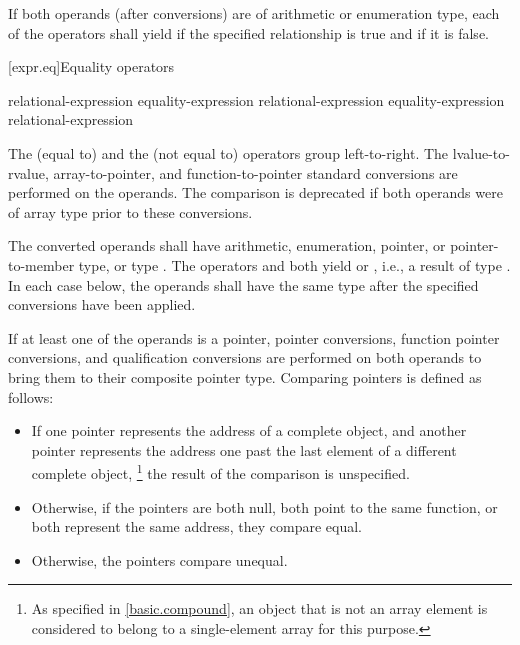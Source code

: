 \pnum
If both operands (after conversions) are of arithmetic or enumeration type, each
of the operators shall yield  if the specified relationship is true
and  if it is false.

[expr.eq]{Equality operators}%
%
%

\begin{bnf}
\br
    relational-expression\br
    equality-expression \terminal{==} relational-expression\br
    equality-expression \terminal{!=} relational-expression
\end{bnf}

\pnum
The \tcode{==} (equal to) and the \tcode{!=} (not equal to) operators
group left-to-right.
The
lvalue-to-rvalue,
array-to-pointer,
and function-to-pointer
standard conversions are performed on the operands.
The comparison is deprecated if
both operands were of array type
prior to these conversions.

\pnum
The converted operands shall have arithmetic, enumeration, pointer,
or pointer-to-member type, or type . The operators
\tcode{==} and \tcode{!=} both yield  or , i.e., a
result of type . In each case below, the operands shall have the
same type after the specified conversions have been applied.

\pnum
{}%
%
If at least one of the operands is a pointer,
pointer conversions,
function pointer conversions, and
qualification conversions
are performed on both operands to bring them to their composite pointer type.
Comparing pointers is defined as follows:

\begin{itemize}
\item
If one pointer represents the address of a complete object, and another
pointer represents the address one past the last element of a different
complete object,%
\footnote{As specified in \ref{basic.compound},
an object that is not an array element is
considered to belong to a single-element array for this purpose.}
the result of the comparison is unspecified.
\item
Otherwise, if the pointers are both null, both point to the same
%
function, or both represent the same address,
they compare equal.
\item
Otherwise, the pointers compare unequal.
\end{itemize}

